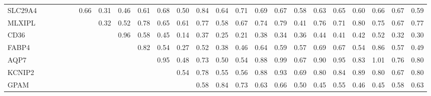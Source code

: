 \begin{longtable}{lrrrrrrrrrrrrrrrrrrrrrrr}
SLC29A4 &               &             &              &           &               &         0.66 &       0.31 &        0.46 &       0.61 &         0.68 &       0.50 &          0.84 &        0.64 &        0.71 &       0.69 &        0.67 &        0.58 &        0.63 &        0.65 &        0.60 &       0.66 &       0.67 &         0.59 \\
MLXIPL  &               &             &              &           &               &              &       0.32 &        0.52 &       0.78 &         0.65 &       0.61 &          0.77 &        0.58 &        0.67 &       0.74 &        0.79 &        0.41 &        0.76 &        0.71 &        0.80 &       0.75 &       0.67 &         0.77 \\
CD36    &               &             &              &           &               &              &            &        0.96 &       0.58 &         0.45 &       0.14 &          0.37 &        0.25 &        0.21 &       0.38 &        0.34 &        0.36 &        0.44 &        0.41 &        0.42 &       0.52 &       0.32 &         0.30 \\
FABP4   &               &             &              &           &               &              &            &             &       0.82 &         0.54 &       0.27 &          0.52 &        0.38 &        0.46 &       0.64 &        0.59 &        0.57 &        0.69 &        0.67 &        0.54 &       0.86 &       0.57 &         0.49 \\
AQP7    &               &             &              &           &               &              &            &             &            &         0.95 &       0.48 &          0.73 &        0.50 &        0.54 &       0.88 &        0.99 &        0.67 &        0.90 &        0.95 &        0.83 &       1.01 &       0.76 &         0.80 \\
KCNIP2  &               &             &              &           &               &              &            &             &            &              &       0.54 &          0.78 &        0.55 &        0.56 &       0.88 &        0.93 &        0.69 &        0.80 &        0.84 &        0.89 &       0.80 &       0.67 &         0.80 \\
GPAM    &               &             &              &           &               &              &            &             &            &              &            &          0.58 &        0.84 &        0.73 &       0.63 &        0.66 &        0.50 &        0.45 &        0.55 &        0.46 &       0.45 &       0.58 &         0.63 \\

\end{longtable}
